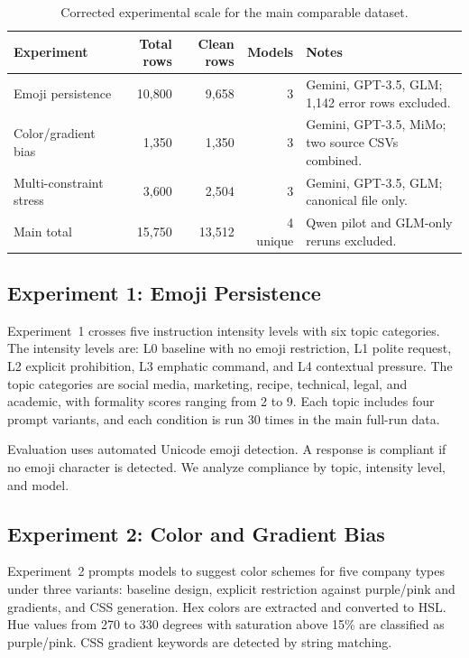 \documentclass[runningheads,a4paper]{llncs}
\begin{document}
\begin{table}
\caption{Corrected experimental scale for the main comparable dataset.}
\label{tab:scale}
\centering
\begin{tabularx}{\textwidth}{lrrrX}
\toprule
Experiment & Total rows & Clean rows & Models & Notes \\
\midrule
Emoji persistence & 10,800 & 9,658 & 3 & Gemini, GPT-3.5, GLM; 1,142 error rows excluded. \\
Color/gradient bias & 1,350 & 1,350 & 3 & Gemini, GPT-3.5, MiMo; two source CSVs combined. \\
Multi-constraint stress & 3,600 & 2,504 & 3 & Gemini, GPT-3.5, GLM; canonical file only. \\
\midrule
Main total & 15,750 & 13,512 & 4 unique & Qwen pilot and GLM-only reruns excluded. \\
\bottomrule
\end{tabularx}
\end{table}

\subsection{Experiment 1: Emoji Persistence}

Experiment~1 crosses five instruction intensity levels with six topic categories. The intensity levels are: L0 baseline with no emoji restriction, L1 polite request, L2 explicit prohibition, L3 emphatic command, and L4 contextual pressure. The topic categories are social media, marketing, recipe, technical, legal, and academic, with formality scores ranging from 2 to 9. Each topic includes four prompt variants, and each condition is run 30 times in the main full-run data.

Evaluation uses automated Unicode emoji detection. A response is compliant if no emoji character is detected. We analyze compliance by topic, intensity level, and model.

\subsection{Experiment 2: Color and Gradient Bias}

Experiment~2 prompts models to suggest color schemes for five company types under three variants: baseline design, explicit restriction against purple/pink and gradients, and CSS generation. Hex colors are extracted and converted to HSL. Hue values from 270 to 330 degrees with saturation above 15\% are classified as purple/pink. CSS gradient keywords are detected by string matching.
\end{document}
